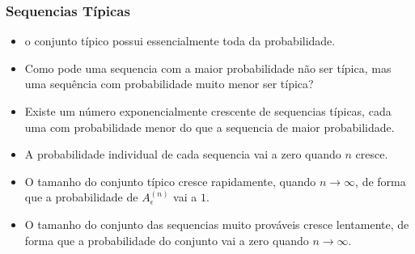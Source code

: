 \begin{frame}%
  \frametitle{Sequencias Típicas}
  \begin{itemize}
  \item o conjunto típico possui essencialmente toda da probabilidade.
  \item Como pode uma sequencia com a maior probabilidade não ser típica,
        mas uma sequência com probabilidade muito menor ser típica?
  \item Existe um número exponencialmente crescente de sequencias típicas, cada uma
        com probabilidade menor do que a sequencia de maior probabilidade.
  \item A probabilidade individual de cada sequencia vai a zero quando $n$ cresce.
  \item O tamanho do conjunto típico cresce rapidamente, quando $n \rightarrow \infty$,
        de forma que a probabilidade de $A_\epsilon^{(n)}$ vai a $1$.
  \item O tamanho do conjunto das sequencias muito prováveis cresce lentamente, de forma
        que a probabilidade do conjunto vai a zero quando $n \rightarrow \infty$. 
  \end{itemize}
\end{frame}

